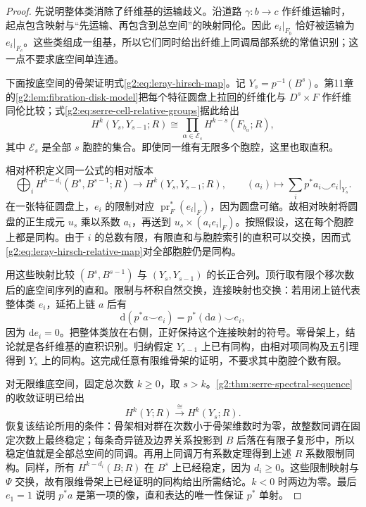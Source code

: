 \begin{proof}
	先说明整体类消除了纤维基的运输歧义。沿道路 \(\gamma:b\to c\) 作纤维运输时，起点包含映射与“先运输、再包含到总空间”的映射同伦。因此 \(e_i|_{F_b}\) 恰好被运输为 \(e_i|_{F_c}\)。这些类组成一组基，所以它们同时给出纤维上同调局部系统的常值识别；这一点不要求底空间单连通。

	下面按底空间的骨架证明式\eqref{g2:eq:leray-hirsch-map}。记 \(Y_s=p^{-1}(B^s)\)。第11章的\cref{g2:lem:fibration-disk-model}把每个特征圆盘上拉回的纤维化与 \(D^s\times F\) 作纤维同伦比较；式\eqref{g2:eq:serre-cell-relative-groups}据此给出
	\[
		H^k(Y_s,Y_{s-1};R)\cong\prod_{\alpha\in\mathcal E_s}H^{k-s}(F_{b_\alpha};R),
	\]
	其中 \(\mathcal E_s\) 是全部 \(s\) 胞腔的集合。即使同一维有无限多个胞腔，这里也取直积。

	相对杯积定义同一公式的相对版本
	\begin{equation}\label{g2:eq:leray-hirsch-relative-map}
		\bigoplus_i H^{k-d_i}(B^s,B^{s-1};R)\longrightarrow H^k(Y_s,Y_{s-1};R),
		\qquad(a_i)\longmapsto\sum_i p^*a_i\smile e_i|_{Y_s}.
	\end{equation}
	在一张特征圆盘上，\(e_i\) 的限制对应 \(\operatorname{pr}_F^*(e_i|_F)\)，因为圆盘可缩。故相对映射将圆盘的正生成元 \(u_s\) 乘以系数 \(a_i\)，再送到 \(u_s\times(a_i e_i|_F)\)。按照假设，这在每个胞腔上都是同构。由于 \(i\) 的总数有限，有限直和与胞腔索引的直积可以交换，因而式\eqref{g2:eq:leray-hirsch-relative-map}对全部胞腔仍是同构。

	用这些映射比较 \((B^s,B^{s-1})\) 与 \((Y_s,Y_{s-1})\) 的长正合列。顶行取有限个移次数后的底空间序列的直和。限制与杯积自然交换，连接映射也交换：若用闭上链代表整体类 \(e_i\)，延拓上链 \(a\) 后有
	\[
		\mathrm d(p^*a\smile e_i)=p^*(\mathrm da)\smile e_i,
	\]
	因为 \(\mathrm de_i=0\)。把整体类放在右侧，正好保持这个连接映射的符号。零骨架上，结论就是各纤维基的直积识别。归纳假定 \(Y_{s-1}\) 上已有同构，由相对项同构及五引理得到 \(Y_s\) 上的同构。这完成任意有限维骨架的证明，不要求其中胞腔个数有限。

	对无限维底空间，固定总次数 \(k\ge0\)，取 \(s>k\)。\cref{g2:thm:serre-spectral-sequence}的收敛证明已给出
	\[
		H^k(Y;R)\xrightarrow{\ \cong\ }H^k(Y_s;R).
	\]
	恢复该结论所用的条件：骨架相对群在次数小于骨架维数时为零，故整数同调在固定次数上最终稳定；每条奇异链及边界关系投影到 \(B\) 后落在有限子复形中，所以稳定值就是全部总空间的同调。再用上同调万有系数定理得到上述 \(R\) 系数限制同构。同样，所有 \(H^{k-d_i}(B;R)\) 在 \(B^s\) 上已经稳定，因为 \(d_i\ge0\)。这些限制映射与 \(\Psi\) 交换，故有限维骨架上已经证明的同构给出所需结论。\(k<0\) 时两边为零。最后 \(e_1=1\) 说明 \(p^*a\) 是第一项的像，直和表达的唯一性保证 \(p^*\) 单射。
\end{proof}

